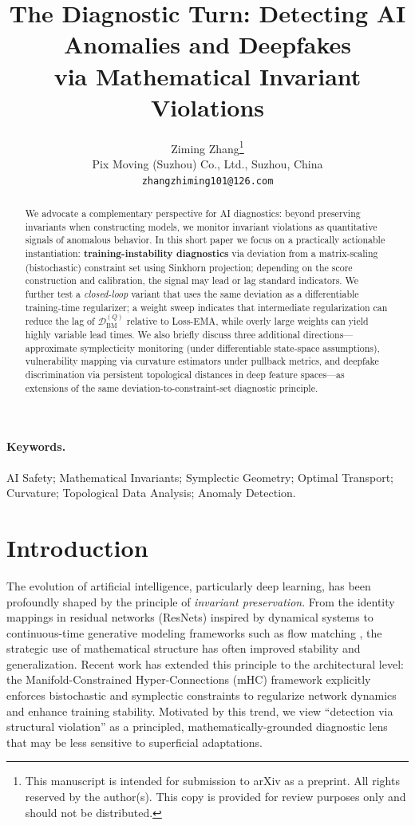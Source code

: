 \documentclass[11pt]{article}
\title{\textbf{The Diagnostic Turn: Detecting AI Anomalies and Deepfakes\\via Mathematical Invariant Violations}}
\author{Ziming Zhang\thanks{This manuscript is intended for submission to arXiv as a preprint. All rights reserved by the author(s). This copy is provided for review purposes only and should not be distributed.} \\
Pix Moving (Suzhou) Co., Ltd., Suzhou, China\\
\texttt{zhangzhiming101@126.com}
}
\date{}
\begin{document}
\maketitle

\begin{abstract}
We advocate a complementary perspective for AI diagnostics: beyond preserving invariants when constructing models, we monitor invariant violations as quantitative signals of anomalous behavior.
In this short paper we focus on a practically actionable instantiation: \textbf{training-instability diagnostics} via deviation from a matrix-scaling (bistochastic) constraint set using Sinkhorn projection; depending on the score construction and calibration, the signal may lead or lag standard indicators.
We further test a \emph{closed-loop} variant that uses the same deviation as a differentiable training-time regularizer; a weight sweep indicates that intermediate regularization can reduce the lag of $\mathcal{D}_{\text{BM}}^{(Q)}$ relative to Loss-EMA, while overly large weights can yield highly variable lead times.
We also briefly discuss three additional directions---approximate symplecticity monitoring (under differentiable state-space assumptions), vulnerability mapping via curvature estimators under pullback metrics, and deepfake discrimination via persistent topological distances in deep feature spaces---as extensions of the same deviation-to-constraint-set diagnostic principle.
\end{abstract}

\paragraph{Keywords.}
AI Safety; Mathematical Invariants; Symplectic Geometry; Optimal Transport; Curvature; Topological Data Analysis; Anomaly Detection.

\section{Introduction}

The evolution of artificial intelligence, particularly deep learning, has been profoundly shaped by the principle of \emph{invariant preservation}. From the identity mappings in residual networks (ResNets) inspired by dynamical systems to continuous-time generative modeling frameworks such as flow matching \cite{lipman2023flow}, the strategic use of mathematical structure has often improved stability and generalization. Recent work has extended this principle to the architectural level: the Manifold-Constrained Hyper-Connections (mHC) framework \cite{deepseek2025mhc} explicitly enforces bistochastic and symplectic constraints to regularize network dynamics and enhance training stability. Motivated by this trend, we view ``detection via structural violation'' as a principled, mathematically-grounded diagnostic lens that may be less sensitive to superficial adaptations.
\end{document}
